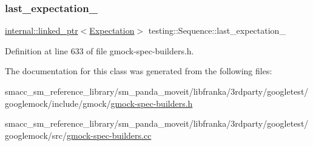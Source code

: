 \subsubsection{\texorpdfstring{last\+\_\+expectation\+\_\+}{last\_expectation\_}}
{\footnotesize\ttfamily \hyperlink{classtesting_1_1internal_1_1linked__ptr}{internal\+::linked\+\_\+ptr}$<$\hyperlink{classtesting_1_1Expectation}{Expectation}$>$ testing\+::\+Sequence\+::last\+\_\+expectation\+\_\+\hspace{0.3cm}{\ttfamily [private]}}



Definition at line 633 of file gmock-\/spec-\/builders.\+h.



The documentation for this class was generated from the following files\+:\begin{DoxyCompactItemize}
\item 
smacc\+\_\+sm\+\_\+reference\+\_\+library/sm\+\_\+panda\+\_\+moveit/libfranka/3rdparty/googletest/googlemock/include/gmock/\hyperlink{gmock-spec-builders_8h}{gmock-\/spec-\/builders.\+h}\item 
smacc\+\_\+sm\+\_\+reference\+\_\+library/sm\+\_\+panda\+\_\+moveit/libfranka/3rdparty/googletest/googlemock/src/\hyperlink{gmock-spec-builders_8cc}{gmock-\/spec-\/builders.\+cc}\end{DoxyCompactItemize}

